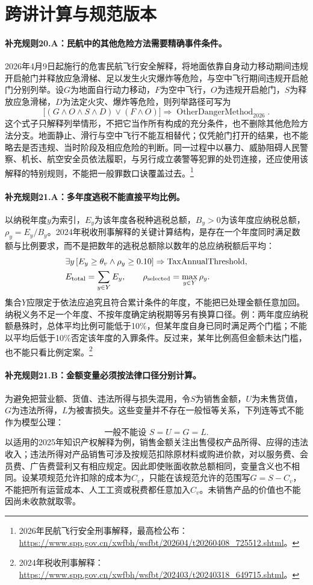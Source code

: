 \section{跨讲计算与规范版本}

\paragraph{补充规则20.A：民航中的其他危险方法需要精确事件条件。}
2026年4月9日起施行的危害民航飞行安全解释，将地面依靠自身动力移动期间违规开启舱门并释放应急滑梯、足以发生火灾爆炸等危险，与空中飞行期间违规开启舱门分别列举。设$G$为地面自行动力移动，$F$为空中飞行，$O$为违规开启舱门，$S$为释放应急滑梯，$D$为法定火灾、爆炸等危险，则列举路径可写为
\[
\bigl[(G\land O\land S\land D)\lor(F\land O)\bigr]
\Rightarrow\operatorname{OtherDangerMethod}_{2026}.
\]
这个式子只解释列举情形，不把它当作所有构成的充分条件，也不删除其他危险方法分支。地面静止、滑行与空中飞行不能互相替代；仅凭舱门打开的结果，也不能略去是否违规、当时阶段及相应危险的判断。同一过程中以暴力、威胁阻碍人民警察、机长、航空安全员依法履职，与另行成立袭警等犯罪的处罚连接，还应使用该解释的特别规则，不能把一般罪数口诀覆盖过去。\footnote{2026年民航飞行安全刑事解释，最高检公布：\url{https://www.spp.gov.cn/xwfbh/wsfbt/202604/t20260408_725512.shtml}。}

\paragraph{补充规则21.A：多年度逃税不能直接平均比例。}
以纳税年度$y$为索引，$E_y$为该年度各税种逃税总额，$B_y>0$为该年度应纳税总额，$\rho_y=E_y/B_y$。2024年税收刑事解释的关键计算结构，是存在一个年度同时满足数额与比例要求，而不是把数年的逃税总额除以数年的总应纳税额后平均：
\[
\begin{aligned}
&\exists y\,[E_y\geq\theta_v\land\rho_y\geq0.10]
\Rightarrow\operatorname{TaxAnnualThreshold},\\
&E_{\rm total}=\sum_{y\in Y}E_y,\qquad
\rho_{\rm selected}=\max_{y\in Y}\rho_y.
\end{aligned}
\]
集合$Y$应限定于依法应追究且符合累计条件的年度，不能把已处理金额任意加回。纳税义务不足一个年度、不按年度确定纳税期等另有换算口径。例：两年度应纳税额悬殊时，总体平均比例可能低于10\%，但某年度自身已同时满足两个门槛；不能以平均后低于10\%否定该年度的入罪条件。反过来，某年比例高但金额未达门槛，也不能只看比例定案。\footnote{2024年税收刑事解释：\url{https://www.spp.gov.cn/xwfbh/wsfbt/202403/t20240318_649715.shtml}。}

\paragraph{补充规则21.B：金额变量必须按法律口径分别计算。}
为避免把营业额、货值、违法所得与损失混用，令$S$为销售金额，$U$为未售货值，$G$为违法所得，$L$为被害损失。这些变量并不存在一般恒等关系，下列连等式不能作为模型公理：
\[
\text{一般不能设 } S=U=G=L.
\]
以适用的2025年知识产权解释为例，销售金额关注出售侵权产品所得、应得的违法收入；违法所得对产品销售可涉及按规范扣除原材料或购进价款，对以服务费、会员费、广告费营利又有相应规定。因此即使账面收款总额相同，变量含义也不相同。设某项规范允许扣除的成本为$C_v$，只能在该规范允许的范围写$G=S-C_v$，不能把所有运营成本、人工工资或税费都任意加入$C_v$。未销售产品的价值也不能因尚未收款就取零。

